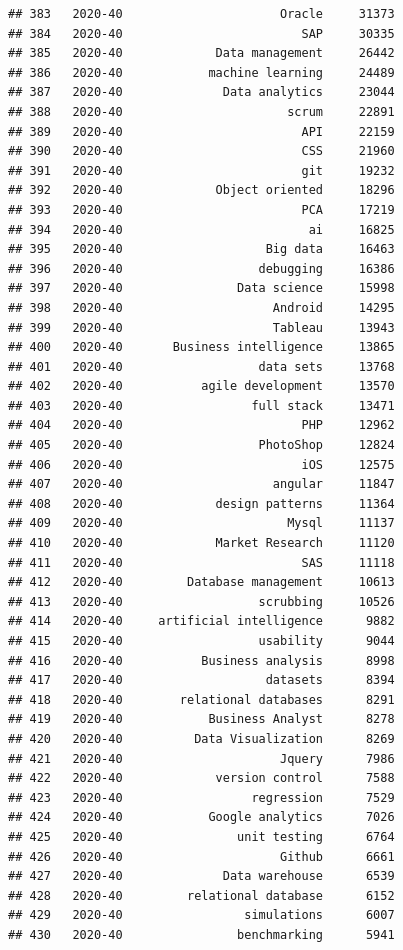 \documentclass[
]{article}
\begin{document}
\begin{verbatim}
## 383   2020-40                      Oracle     31373
## 384   2020-40                         SAP     30335
## 385   2020-40             Data management     26442
## 386   2020-40            machine learning     24489
## 387   2020-40              Data analytics     23044
## 388   2020-40                       scrum     22891
## 389   2020-40                         API     22159
## 390   2020-40                         CSS     21960
## 391   2020-40                         git     19232
## 392   2020-40             Object oriented     18296
## 393   2020-40                         PCA     17219
## 394   2020-40                          ai     16825
## 395   2020-40                    Big data     16463
## 396   2020-40                   debugging     16386
## 397   2020-40                Data science     15998
## 398   2020-40                     Android     14295
## 399   2020-40                     Tableau     13943
## 400   2020-40       Business intelligence     13865
## 401   2020-40                   data sets     13768
## 402   2020-40           agile development     13570
## 403   2020-40                  full stack     13471
## 404   2020-40                         PHP     12962
## 405   2020-40                   PhotoShop     12824
## 406   2020-40                         iOS     12575
## 407   2020-40                     angular     11847
## 408   2020-40             design patterns     11364
## 409   2020-40                       Mysql     11137
## 410   2020-40             Market Research     11120
## 411   2020-40                         SAS     11118
## 412   2020-40         Database management     10613
## 413   2020-40                   scrubbing     10526
## 414   2020-40     artificial intelligence      9882
## 415   2020-40                   usability      9044
## 416   2020-40           Business analysis      8998
## 417   2020-40                    datasets      8394
## 418   2020-40        relational databases      8291
## 419   2020-40            Business Analyst      8278
## 420   2020-40          Data Visualization      8269
## 421   2020-40                      Jquery      7986
## 422   2020-40             version control      7588
## 423   2020-40                  regression      7529
## 424   2020-40            Google analytics      7026
## 425   2020-40                unit testing      6764
## 426   2020-40                      Github      6661
## 427   2020-40              Data warehouse      6539
## 428   2020-40         relational database      6152
## 429   2020-40                 simulations      6007
## 430   2020-40                benchmarking      5941

\end{verbatim}
\end{document}
